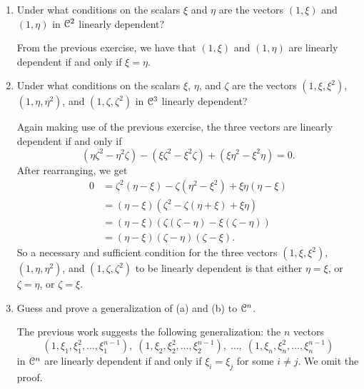 \begin{enumerate}
\item Under what conditions on the scalars $\xi$ and $\eta$ are the
  vectors $(1,\xi)$ and $(1,\eta)$ in $\mathcal{C}^2$ linearly dependent?
  \begin{solution}
    From the previous exercise, we have that $(1,\xi)$ and $(1,\eta)$
    are linearly dependent if and only if $\xi = \eta$.
  \end{solution}
\item Under what conditions on the scalars $\xi$, $\eta$, and $\zeta$
  are the vectors $(1,\xi,\xi^2)$, $(1,\eta,\eta^2)$, and
  $(1,\zeta,\zeta^2)$ in $\mathcal{C}^3$ linearly dependent?
  \begin{solution}
    Again making use of the previous exercise, the three vectors are
    linearly dependent if and only if
    \begin{equation*}
      (\eta\zeta^2 - \eta^2\zeta)
      - (\xi\zeta^2 - \xi^2\zeta)
      + (\xi\eta^2 - \xi^2\eta) = 0.
    \end{equation*}
    After rearranging, we get
    \begin{align*}
      0 &= \zeta^2(\eta - \xi) - \zeta(\eta^2 - \xi^2)
          + \xi\eta(\eta - \xi) \\
        &= (\eta - \xi)(\zeta^2 - \zeta(\eta + \xi) + \xi\eta) \\
        &= (\eta - \xi)(\zeta(\zeta - \eta) - \xi(\zeta - \eta)) \\
        &= (\eta - \xi)(\zeta - \eta)(\zeta - \xi).
    \end{align*}
    So a necessary and sufficient condition for the three vectors
    $(1,\xi,\xi^2)$, $(1,\eta,\eta^2)$, and $(1,\zeta,\zeta^2)$ to be
    linearly dependent is that either $\eta = \xi$, or $\zeta = \eta$,
    or $\zeta = \xi$.
  \end{solution}
\item Guess and prove a generalization of (a) and (b) to $\mathcal{C}^n$.
  \begin{solution}
    The previous work suggests the following generalization: the $n$ vectors
    \begin{equation*}
      (1,\xi_1,\xi_1^2,\dots,\xi_1^{n-1}),\;
      (1,\xi_2,\xi_2^2,\dots,\xi_2^{n-1}),\;
      \dots,\;
      (1,\xi_n,\xi_n^2,\dots,\xi_n^{n-1})
    \end{equation*}
    in $\mathcal{C}^n$ are linearly dependent if and only if $\xi_i = \xi_j$
    for some $i\neq j$. We omit the proof.
  \end{solution}
\end{enumerate}

